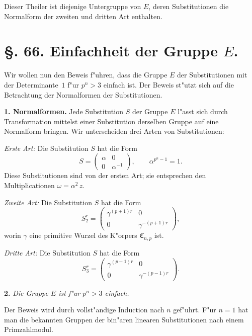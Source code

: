 \documentclass[12pt,a4paper]{article}
\theoremstyle{plain}
\theoremstyle{definition}
\theoremstyle{remark}
\begin{document}
Dieser Theiler ist diejenige Untergruppe von $E$, deren Substitutionen die Normalform der zweiten und dritten Art enthalten.

\section*{\S. 66. Einfachheit der Gruppe $E$.}

Wir wollen nun den Beweis f"uhren, dass die Gruppe $E$ der Substitutionen mit der Determinante~$1$ f"ur $p^{n} > 3$ einfach ist. Der Beweis st"utzt sich auf die Betrachtung der Normalformen der Substitutionen.

\medskip\noindent\textbf{1. Normalformen.} Jede Substitution $S$ der Gruppe $E$ l"asst sich durch Transformation mittelst einer Substitution derselben Gruppe auf eine Normalform bringen. Wir unterscheiden drei Arten von Substitutionen:

\emph{Erste Art:} Die Substitution $S$ hat die Form
\begin{equation}\tag{1}
S = \begin{pmatrix} \alpha & 0 \\ 0 & \alpha^{-1} \end{pmatrix},\qquad \alpha^{p^{n}-1} = 1.
\end{equation}
Diese Substitutionen sind von der ersten Art; sie entsprechen den Multiplicationen $\omega = \alpha^{2}\,z$.

\emph{Zweite Art:} Die Substitution $S$ hat die Form
\begin{equation}\tag{2}
S_{2}^{r} = \begin{pmatrix} \gamma^{(p+1)r} & 0 \\ 0 & \gamma^{-(p+1)r} \end{pmatrix},
\end{equation}
worin $\gamma$ eine primitive Wurzel des K"orpers $\mathfrak{C}_{n,p}$ ist.

\emph{Dritte Art:} Die Substitution $S$ hat die Form
\begin{equation}\tag{3}
S_{3}^{r} = \begin{pmatrix} \gamma^{(p-1)r} & 0 \\ 0 & \gamma^{-(p-1)r} \end{pmatrix}.
\end{equation}

\medskip\noindent\textbf{2.} \emph{Die Gruppe $E$ ist f"ur $p^{n} > 3$ einfach.}

\smallskip
Der Beweis wird durch vollst"andige Induction nach $n$ gef"uhrt. F"ur $n = 1$ hat man die bekannten Gruppen der bin"aren linearen Substitutionen nach einem Primzahlmodul.
\end{document}
